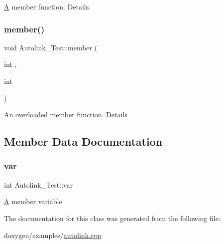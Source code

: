\mbox{\hyperlink{class_a}{A}} member function. Details. \mbox{\label{class_autolink___test_acf783a43c2b4b6cc9dd2361784eca2e1}} 
\subsubsection{\texorpdfstring{member()}{member()}\hspace{0.1cm}{\footnotesize\ttfamily [2/2]}}
{\footnotesize\ttfamily void Autolink\+\_\+\+Test\+::member (\begin{DoxyParamCaption}\item[{int}]{,  }\item[{int}]{ }\end{DoxyParamCaption})}

An overloaded member function. Details 

\subsection{Member Data Documentation}
\mbox{\label{class_autolink___test_a8de85603114bc9b9e53bd40764e9b499}} 
\subsubsection{\texorpdfstring{var}{var}}
{\footnotesize\ttfamily int Autolink\+\_\+\+Test\+::var\hspace{0.3cm}{\ttfamily [protected]}}

\mbox{\hyperlink{class_a}{A}} member variable 

The documentation for this class was generated from the following file\+:\begin{DoxyCompactItemize}
\item 
doxygen/examples/\mbox{\hyperlink{autolink_8cpp}{autolink.\+cpp}}\end{DoxyCompactItemize}
